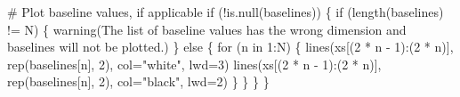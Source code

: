 \documentclass[
  letterpaper,
  DIV=11,
  numbers=noendperiod]{scrartcl}
\newenvironment{Shaded}{\begin{snugshade}}{\end{snugshade}}
\newcommand{\AttributeTok}[1]{\textcolor[rgb]{0.40,0.45,0.13}{#1}}
\newcommand{\CommentTok}[1]{\textcolor[rgb]{0.37,0.37,0.37}{#1}}
\newcommand{\ControlFlowTok}[1]{\textcolor[rgb]{0.00,0.23,0.31}{#1}}
\newcommand{\DecValTok}[1]{\textcolor[rgb]{0.68,0.00,0.00}{#1}}
\newcommand{\FunctionTok}[1]{\textcolor[rgb]{0.28,0.35,0.67}{#1}}
\newcommand{\NormalTok}[1]{\textcolor[rgb]{0.00,0.23,0.31}{#1}}
\newcommand{\SpecialCharTok}[1]{\textcolor[rgb]{0.37,0.37,0.37}{#1}}
\newcommand{\StringTok}[1]{\textcolor[rgb]{0.13,0.47,0.30}{#1}}
\begin{document}
\begin{Shaded}
\begin{Highlighting}[]
  \CommentTok{\# Plot baseline values, if applicable}
  \ControlFlowTok{if}\NormalTok{ (}\SpecialCharTok{!}\FunctionTok{is.null}\NormalTok{(baselines)) \{}
    \ControlFlowTok{if}\NormalTok{ (}\FunctionTok{length}\NormalTok{(baselines) }\SpecialCharTok{!=}\NormalTok{ N) \{}
      \FunctionTok{warning}\NormalTok{(}\StringTok{\textquotesingle{}The list of baseline values has the wrong dimension and baselines will not be plotted.\textquotesingle{}}\NormalTok{)}
\NormalTok{    \} }\ControlFlowTok{else}\NormalTok{ \{}
      \ControlFlowTok{for}\NormalTok{ (n }\ControlFlowTok{in} \DecValTok{1}\SpecialCharTok{:}\NormalTok{N) \{}
        \FunctionTok{lines}\NormalTok{(xs[(}\DecValTok{2} \SpecialCharTok{*}\NormalTok{ n }\SpecialCharTok{{-}} \DecValTok{1}\NormalTok{)}\SpecialCharTok{:}\NormalTok{(}\DecValTok{2} \SpecialCharTok{*}\NormalTok{ n)], }\FunctionTok{rep}\NormalTok{(baselines[n], }\DecValTok{2}\NormalTok{),}
              \AttributeTok{col=}\StringTok{"white"}\NormalTok{, }\AttributeTok{lwd=}\DecValTok{3}\NormalTok{)}
        \FunctionTok{lines}\NormalTok{(xs[(}\DecValTok{2} \SpecialCharTok{*}\NormalTok{ n }\SpecialCharTok{{-}} \DecValTok{1}\NormalTok{)}\SpecialCharTok{:}\NormalTok{(}\DecValTok{2} \SpecialCharTok{*}\NormalTok{ n)], }\FunctionTok{rep}\NormalTok{(baselines[n], }\DecValTok{2}\NormalTok{),}
              \AttributeTok{col=}\StringTok{"black"}\NormalTok{, }\AttributeTok{lwd=}\DecValTok{2}\NormalTok{)}
\NormalTok{      \}}
\NormalTok{    \}}
\NormalTok{  \}}
\NormalTok{\}}
\end{Highlighting}
\end{Shaded}
\end{document}

